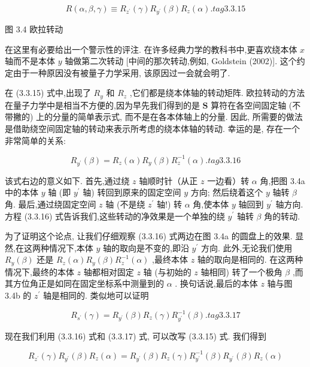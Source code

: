 $$
R\left( {\alpha ,\beta ,\gamma }\right) \equiv {R}_{{z}^{\prime }}\left( \gamma \right) {R}_{{y}^{\prime }}\left( \beta \right) {R}_{z}\left( \alpha \right) . tag{3. 3.15}
$$


图 3.4 欧拉转动

在这里有必要给出一个警示性的评注. 在许多经典力学的教科书中,更喜欢绕本体 $x$ 轴而不是本体 $y$ 轴做第二次转动 [中间的那次转动,例如, Goldstein (2002)]. 这个约定由于一种原因没有被量子力学采用, 该原因过一会就会明了.

在 (3.3.15) 式中,出现了 ${R}_{y}$ 和 ${R}_{z}$ ,它们都是绕本体轴的转动矩阵. 欧拉转动的方法在量子力学中是相当不方便的,因为早先我们得到的是 $\mathbf{S}$ 算符在各空间固定轴 (不带撇的) 上的分量的简单表示式, 而不是在各本体轴上的分量. 因此, 所需要的做法是借助绕空间固定轴的转动来表示所考虑的绕本体轴的转动. 幸运的是, 存在一个非常简单的关系:

$$
{R}_{{y}^{\prime }}\left( \beta \right) = {R}_{z}\left( \alpha \right) {R}_{y}\left( \beta \right) {R}_{z}^{-1}\left( \alpha \right) . tag{3.3.16}
$$

该式右边的意义如下. 首先,通过绕 $z$ 轴顺时针（从正 $z$ 一边看）转 $\alpha$ 角,把图 3.4a 中的本体 $y$ 轴 (即 ${y}^{\prime }$ 轴) 转回到原来的固定空间 $y$ 方向; 然后绕着这个 $y$ 轴转 $\beta$ 角. 最后,通过绕固定空间 $z$ 轴 (不是绕 ${z}^{\prime }$ 轴!) 转 $\alpha$ 角,使本体 $y$ 轴回到 ${y}^{\prime }$ 轴方向. 方程 (3.3.16) 式告诉我们,这些转动的净效果是一个单独的绕 ${y}^{\prime }$ 轴转 $\beta$ 角的转动.

为了证明这个论点, 让我们仔细观察 (3.3.16) 式两边在图 3.4a 的圆盘上的效果. 显然,在这两种情况下,本体 $y$ 轴的取向是不变的,即沿 ${y}^{\prime }$ 方向. 此外,无论我们使用 ${R}_{y}\left( \beta \right)$ 还是 ${R}_{z}\left( \alpha \right) {R}_{y}\left( \beta \right) {R}_{z}^{-1}\left( \alpha \right)$ ,最终本体 $z$ 轴的取向是相同的. 在这两种情况下,最终的本体 $z$ 轴都相对固定 $z$ 轴 (与初始的 $z$ 轴相同) 转了一个极角 $\beta$ ,而其方位角正是如同在固定坐标系中测量到的 $\alpha$ . 换句话说,最后的本体 $z$ 轴与图 3.4b 的 ${z}^{\prime }$ 轴是相同的. 类似地可以证明

$$
{R}_{{s}^{\prime }}\left( \gamma \right) = {R}_{{y}^{\prime }}\left( \beta \right) {R}_{z}\left( \gamma \right) {R}_{{y}^{\prime }}^{-1}\left( \beta \right) . tag{3. 3.17}
$$

现在我们利用 (3.3.16) 式和 (3.3.17) 式, 可以改写 (3.3.15) 式. 我们得到

$$
{R}_{{z}^{\prime }}\left( \gamma \right) {R}_{{y}^{\prime }}\left( \beta \right) {R}_{z}\left( \alpha \right) = {R}_{{y}^{\prime }}\left( \beta \right) {R}_{z}\left( \gamma \right) {R}_{{y}^{\prime }}^{-1}\left( \beta \right) {R}_{{y}^{\prime }}\left( \beta \right) {R}_{z}\left( \alpha \right)
$$


